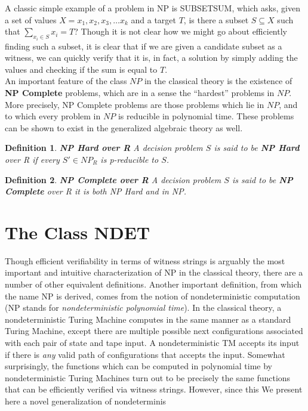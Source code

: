 \documentclass[twoside]{article}
\newtheorem{definition}{Definition}[section]
\begin{document}
A classic simple example of a problem in NP is SUBSETSUM, which asks,
given a set of values $X = {x_1, x_2, x_3, \ldots x_k}$ and a target
$T$, is there a subset $S \subseteq X$ such that $\sum\limits_{x_i \in
  S} x_i = T$?  Though it is not clear how we might go about
efficiently finding such a subset, it is clear that if we are given a
candidate subset as a witness, we can quickly verify that it is, in
fact, a solution by simply adding the values and checking if the sum
is equal to $T$.\\

An important feature of the class $NP$ in the classical theory is the
existence of \textbf{NP Complete} problems, which are in a sense the
``hardest'' problems in $NP$.  More precisely, NP Complete problems
are those problems which lie in $NP$, and to which every problem in
$NP$ is reducible in polynomial time.  These problems can be shown to
exist in the generalized algebraic theory as well.

\begin{definition}{\textbf{NP Hard over R}}
  A decision problem $S$ is said to be \textbf{NP Hard} over R if
  every $S' \in NP_R$ is p-reducible to $S$.
\end{definition}

\begin{definition}{\textbf{NP Complete over R}}
  A decision problem $S$ is said to be \textbf{NP Complete} over R it
  is both NP Hard and in NP.
\end{definition}



\section{The Class NDET}

Though efficient verifiability in terms of witness strings is arguably
the most important and intuitive characterization of NP in the
classical theory, there are a number of other equivalent definitions.
Another important definition, from which the name NP is derived, comes
from the notion of nondeterministic computation (NP stands for
\emph{nondeterministic polynomial time}).  In the classical theory, a
nondeterministic Turing Machine computes in the same manner as a
standard Turing Machine, except there are multiple possible next
configurations associated with each pair of state and tape input.  A
nondeterministic TM accepts its input if there is \emph{any} valid
path of configurations that accepts the input.  Somewhat surprisingly,
the functions which can be computed in polynomial time by
nondeterministic Turing Machines turn out to be precisely the same
functions that can be efficiently verified via witness strings.
However, since this We present here a novel generalization of nondeterminis

  
\end{document}
